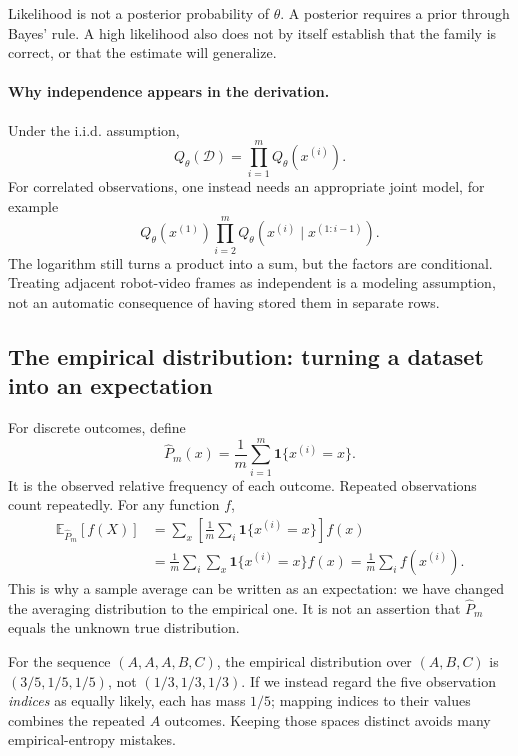Likelihood is not a posterior probability of $\theta$. A posterior requires a
prior through Bayes' rule. A high likelihood also does not by itself establish
that the family is correct, or that the estimate will generalize.

\paragraph{Why independence appears in the derivation.}
Under the i.i.d. assumption,
\[
Q_\theta(\mathcal D)=\prod_{i=1}^m Q_\theta(x^{(i)}).
\]
For correlated observations, one instead needs an appropriate joint model, for
example
\[
Q_\theta(x^{(1)})\prod_{i=2}^mQ_\theta(x^{(i)}\mid x^{(1:i-1)}).
\]
The logarithm still turns a product into a sum, but the factors are conditional.
Treating adjacent robot-video frames as independent is a modeling assumption,
not an automatic consequence of having stored them in separate rows.

\subsection{The empirical distribution: turning a dataset into an expectation}
For discrete outcomes, define
\[
\hat P_m(x)=\frac1m\sum_{i=1}^m\mathbf 1\{x^{(i)}=x\}.
\]
It is the observed relative frequency of each outcome. Repeated observations
count repeatedly. For any function $f$,
\begin{align*}
\mathbb E_{\hat P_m}[f(X)]
&=\sum_x\left[\frac1m\sum_i\mathbf1\{x^{(i)}=x\}\right]f(x)\\
&=\frac1m\sum_i\sum_x\mathbf1\{x^{(i)}=x\}f(x)
=\frac1m\sum_i f(x^{(i)}).
\end{align*}
This is why a sample average can be written as an expectation: we have changed
the averaging distribution to the empirical one. It is not an assertion that
$\hat P_m$ equals the unknown true distribution.

For the sequence $(A,A,A,B,C)$, the empirical distribution over $(A,B,C)$ is
$(3/5,1/5,1/5)$, not $(1/3,1/3,1/3)$. If we instead regard the five observation
\emph{indices} as equally likely, each has mass $1/5$; mapping indices to their
values combines the repeated $A$ outcomes. Keeping those spaces distinct avoids
many empirical-entropy mistakes.

